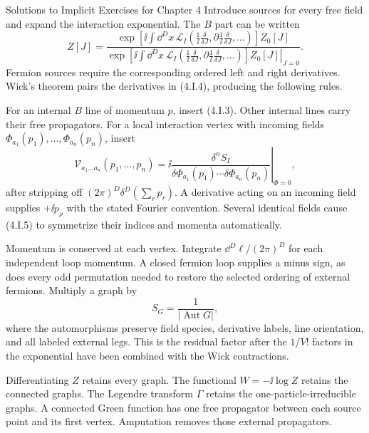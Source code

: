 \begin{bankssolutions}{Solutions to Implicit Exercises for Chapter 4}
Introduce sources for every free field and expand the interaction
exponential.  The $B$ part can be written
\begin{equation*}
 Z[J]=
 \frac{
  \exp\!\left[\ii\int\dd^D x\,
 \mathcal L_I\!\left(
  \frac{1}{\ii}\frac{\delta}{\delta J},
  \partial\frac{1}{\ii}\frac{\delta}{\delta J},\ldots
 \right)\right]Z_0[J]}
 {
  \left.\exp\!\left[\ii\int\dd^D x\,
 \mathcal L_I\!\left(
  \frac{1}{\ii}\frac{\delta}{\delta J},
  \partial\frac{1}{\ii}\frac{\delta}{\delta J},\ldots
 \right)\right]Z_0[J]\right|_{J=0}}.
 \tag{4.I.4}
\end{equation*}
Fermion sources require the corresponding ordered left and right
derivatives.  Wick's theorem pairs the derivatives in (4.I.4), producing
the following rules.

For an internal $B$ line of momentum $p$, insert (4.I.3).  Other internal
lines carry their free propagators.  For a local interaction vertex with
incoming fields $\Phi_{a_1}(p_1),\ldots,\Phi_{a_n}(p_n)$, insert
\begin{equation*}
 \mathcal V_{a_1\ldots a_n}(p_1,\ldots,p_n)
 =\left.
 \ii\frac{\delta^n S_I}
 {\delta\Phi_{a_1}(p_1)\cdots\delta\Phi_{a_n}(p_n)}
 \right|_{\Phi=0},
 \tag{4.I.5}
\end{equation*}
after stripping off $(2\pi)^D\delta^D(\sum_rp_r)$.  A derivative acting on
an incoming field supplies $+\ii p_\rho$ with the stated Fourier convention.
Several identical fields cause (4.I.5) to symmetrize their indices and
momenta automatically.

Momentum is conserved at each vertex.  Integrate $\dd^D\ell/(2\pi)^D$ for
each independent loop momentum.  A closed fermion loop supplies a minus
sign, as does every odd permutation needed to restore the selected ordering
of external fermions.  Multiply a graph by
\begin{equation*}
 S_G=\frac{1}{|\operatorname{Aut}G|},
 \tag{4.I.6}
\end{equation*}
where the automorphisms preserve field species, derivative labels, line
orientation, and all labeled external legs.  This is the residual factor
after the $1/V!$ factors in the exponential have been combined with the Wick
contractions.

Differentiating $Z$ retains every graph.  The functional
$W=-\ii\log Z$ retains the connected graphs.  The Legendre transform
$\Gamma$ retains the one-particle-irreducible graphs.  A connected Green
function has one free propagator between each source point and its first
vertex.  Amputation removes those external propagators.


\end{bankssolutions}
